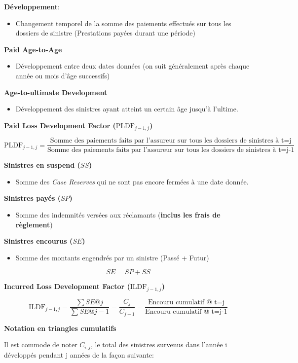 \documentclass[11pt,french]{report}
\begin{document}
\textbf{Développement}:
\begin{itemize}
\item Changement temporel de la somme des paiements effectués sur tous les dossiers de sinistre (Prestations payées durant une période)
\end{itemize}
  
\textbf{Paid Age-to-Age}
\begin{itemize}
\item Développement entre deux dates données (on suit généralement après chaque année ou mois d'âge successifs)
\end{itemize}
 
\textbf{Age-to-ultimate Development}
\begin{itemize}
\item Développement des sinistres ayant atteint un certain âge jusqu'à l'ultime.
\end{itemize}

\textbf{Paid Loss Development Factor ($\text{PLDF}_{j-1,j}$)}

$$\text{PLDF}_{j-1,j} = \frac{\text{Somme des paiements faits par l'assureur sur tous les dossiers de sinistres à t=j}}{\text{Somme des paiements faits par l'assureur sur tous les dossiers de sinistres à t=j-1}}$$

\textbf{Sinistres en suspend ($SS$)}
\begin{itemize}
  \item Somme des \textit{Case Reserves} qui ne sont pas encore fermées à une date donnée.
 \end{itemize}
\textbf{Sinistres payés ($SP$)}
\begin{itemize}
  \item Somme des indemnités versées aux réclamants (\textbf{inclus les frais de règlement})
 \end{itemize} 
\textbf{Sinistres encourus ($SE$)}
\begin{itemize}
  \item Somme des montants engendrés par un sinistre (Passé + Futur)
\end{itemize}
$$SE = SP + SS$$

\textbf{Incurred Loss Development Factor ($\text{ILDF}_{j-1,j}$)}

$$\text{ILDF}_{j-1,j}=\frac{\sum SE@j}{\sum SE@j-1}=\frac{C_j}{C_{j-1}}=\frac{\text{Encouru cumulatif @ t=j}}{\text{Encouru cumulatif @ t=j-1}}$$

\textbf{Notation en triangles cumulatifs}

Il est commode de noter $C_{i,j}$, le total des sinistres survenus dans l'année i développés pendant j années de la façon suivante:
\end{document}
